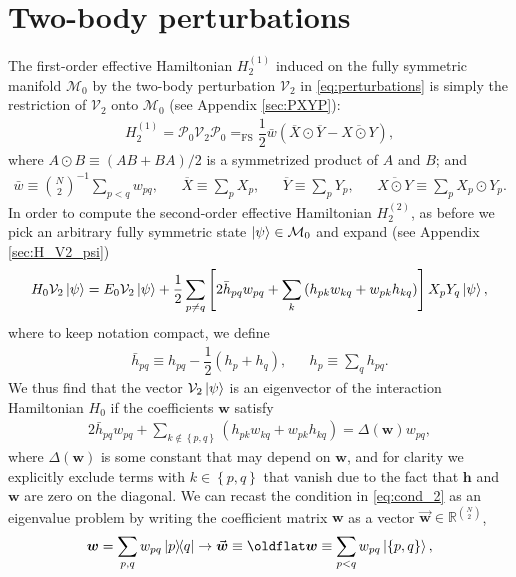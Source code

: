 \documentclass[nofootinbib,notitlepage,11pt]{revtex4-2}
\newcommand{\f}[2]{\dfrac{#1}{#2}} %
\newcommand{\p}[1]{\left(#1\right)} %
\renewcommand{\sp}[1]{\left[#1\right]} %
\renewcommand{\set}[1]{\left\{#1\right\}} %
\newcommand{\m}{\bm} %
\renewcommand{\v}{\vec} %
\newcommand{\1}{\mathds{1}}
\newcommand{\M}{\mathcal{M}}
\renewcommand{\P}{\mathcal{P}}
\newcommand{\V}{\mathcal{V}}
\newcommand{\RR}{\mathbb{R}}
\newcommand{\EQFS}{=_{\text{FS}}}
\newcommand{\col}{\overline}
\let\flat\oldflat
\DeclareMathOperator{\flat}{flat}
\begin{document}
\section{Two-body perturbations}
\label{sec:two_body}

The first-order effective Hamiltonian $H_2^{(1)}$ induced on the fully
symmetric manifold $\M_0$ by the two-body perturbation $\V_2$ in
\eqref{eq:perturbations} is simply the restriction of $\V_2$ onto
$\M_0$ (see Appendix \ref{sec:PXYP}):
\begin{align}
  H_2^{(1)}
  = \P_0 \V_2 \P_0
  \EQFS \f12 \bar w \p{\col{X}\odot\col{Y} - \col{X\odot Y}},
\end{align}
where $A\odot B\equiv\p{AB+BA}/2$ is a symmetrized product of $A$ and
$B$; and
\begin{align}
  \bar w \equiv {N\choose 2}^{-1} \sum_{p<q} w_{pq},
  &&
  \col{X} \equiv \sum_p X_p,
  &&
  \col{Y} \equiv \sum_p Y_p,
  &&
  \col{X\odot Y} \equiv \sum_p X_p\odot Y_p.
\end{align}
In order to compute the second-order effective Hamiltonian
$H_2^{(2)}$, as before we pick an arbitrary fully symmetric state
$\ket\psi\in\M_0$ and expand (see Appendix \ref{sec:H_V2_psi})
\begin{align}
  H_0 \V_2 \ket\psi
  = E_0 \V_2 \ket\psi
  + \f12 \sum_{p\ne q} \sp{2\bar h_{pq} w_{pq}
    + \sum_k \p{h_{pk} w_{kq} + w_{pk} h_{kq}}}
  X_p Y_q \ket\psi,
  \label{eq:H_V2_psi}
\end{align}
where to keep notation compact, we define
\begin{align}
  \bar h_{pq} \equiv h_{pq} - \f12\p{h_p + h_q},
  &&
  h_p \equiv \sum_q h_{pq}.
\end{align}
We thus find that the vector $\V_2\ket\psi$ is an eigenvector of the
interaction Hamiltonian $H_0$ if the coefficients $\m w$ satisfy
\begin{align}
  2 \bar h_{pq} w_{pq}
  + \sum_{k\notin\set{p,q}} \p{h_{pk} w_{kq} + w_{pk} h_{kq}}
  = \Delta\p{\m w} w_{pq},
  \label{eq:cond_2}
\end{align}
where $\Delta\p{\m w}$ is some constant that may depend on $\m w$, and
for clarity we explicitly exclude terms with $k\in\set{p,q}$ that
vanish due to the fact that $\m h$ and $\m w$ are zero on the
diagonal.  We can recast the condition in \eqref{eq:cond_2} as an
eigenvalue problem by writing the coefficient matrix $\m w$ as a
vector $\v{\m w}\in\RR^{N\choose 2}$,
\begin{align}
  \m w = \sum_{p,q} w_{pq} \op{p}{q}
  \to \v{\m w} \equiv \flat\m w
  \equiv \sum_{p<q} w_{pq} \ket{\set{p,q}},
\end{align}
\end{document}
